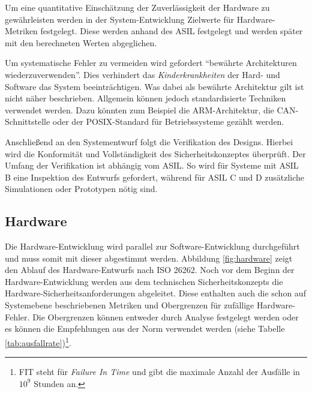 \documentclass[a4paper,DIV=calc,ngerman]{scrartcl}
\begin{document}
Um eine quantitative Einschätzung der Zuverlässigkeit der Hardware zu gewährleisten werden in der System-Entwicklung Zielwerte für Hardware-Metriken festgelegt. Diese werden anhand des ASIL festgelegt und werden später mit den berechneten Werten abgeglichen.

Um systematische Fehler zu vermeiden wird gefordert "`bewährte Architekturen wiederzuverwenden"'. Dies verhindert das \emph{Kinderkrankheiten} der Hard- und Software das System beeinträchtigen. Was dabei als bewährte Architektur gilt ist nicht näher beschrieben. Allgemein können jedoch standardisierte Techniken verwendet werden. Dazu könnten zum Beispiel die ARM-Architektur, die CAN-Schnittstelle oder der POSIX-Standard für Betriebssysteme gezählt werden.

Anschließend an den Systementwurf folgt die Verifikation des Designs. Hierbei wird die Konformität und Vollständigkeit des Sicherheitskonzeptes überprüft. Der Umfang der Verifikation ist abhängig vom ASIL. So wird für Systeme mit ASIL B eine Inspektion des Entwurfs gefordert, während für ASIL C und D zusätzliche Simulationen oder Prototypen nötig sind.




\subsection{Hardware}
\label{sec:Hardware}

Die Hardware-Entwicklung wird parallel zur Software-Entwicklung durchgeführt und muss somit mit dieser abgestimmt werden. Abbildung \ref{fig:hardware} zeigt den Ablauf des Hardware-Entwurfs nach ISO 26262. Noch vor dem Beginn der Hardware-Entwicklung werden aus dem technischen Sicherheitskonzepts die Hardware-Sicherheitsanforderungen abgeleitet. Diese enthalten auch die schon auf Systemebene beschriebenen Metriken und Obergrenzen für zufällige Hardware-Fehler. Die Obergrenzen können entweder durch Analyse festgelegt werden oder es können die Empfehlungen aus der Norm verwendet werden (siehe Tabelle \ref{tab:ausfallrate})\footnote{FIT steht für \emph{Failure In Time} und gibt die maximale Anzahl der Ausfälle in $10^9$ Stunden an.}. 
\end{document}
